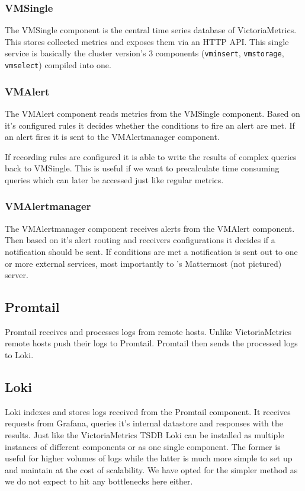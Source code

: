 \subsubsection{VMSingle}

The VMSingle component is the central time series database of VictoriaMetrics.
This stores collected metrics and exposes them via an HTTP API. This single
service is basically the cluster version's 3 components (\verb+vminsert+,
\verb+vmstorage+, \verb+vmselect+) compiled into one.

\subsubsection{VMAlert}

The VMAlert component reads metrics from the VMSingle component. Based on it's
configured rules it decides whether the conditions to fire an alert are met. If
an alert fires it is sent to the VMAlertmanager component.

If recording rules are configured it is able to write the results of complex
queries back to VMSingle. This is useful if we want to precalculate time
consuming queries which can later be accessed just like regular metrics.

\subsubsection{VMAlertmanager}

The VMAlertmanager component receives alerts from the VMAlert component. Then
based on it's alert routing and receivers configurations it decides if a
notification should be sent. If conditions are met a notification is sent out
to one or more external services, most importantly to \kszk's Mattermost
(not pictured) server.

\subsection{Promtail}

Promtail receives and processes logs from remote hosts. Unlike VictoriaMetrics
remote hosts push their logs to Promtail. Promtail then sends the processed
logs to Loki.

\subsection{Loki}

Loki indexes and stores logs received from the Promtail component. It receives
requests from Grafana, queries it's internal datastore and responses with the
results. Just like the VictoriaMetrics TSDB Loki can be installed as multiple
instances of different components or as one single component. The former is
useful for higher volumes of logs while the latter is much more simple to set
up and maintain at the cost of scalability. We have opted for the simpler
method as we do not expect to hit any bottlenecks here either.

